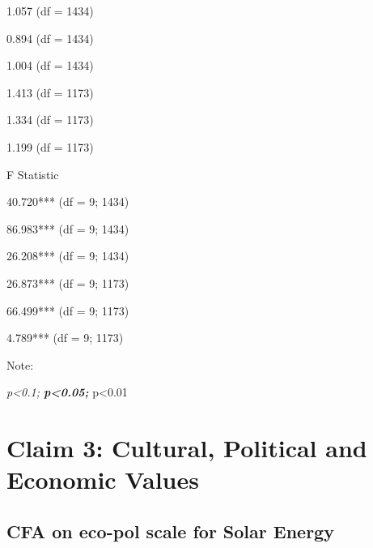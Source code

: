 \documentclass[
]{article}
\begin{document}
\begin{landscape}
1.057 (df = 1434)

0.894 (df = 1434)

1.004 (df = 1434)

1.413 (df = 1173)

1.334 (df = 1173)

1.199 (df = 1173)

F Statistic

40.720*** (df = 9; 1434)

86.983*** (df = 9; 1434)

26.208*** (df = 9; 1434)

26.873*** (df = 9; 1173)

66.499*** (df = 9; 1173)

4.789*** (df = 9; 1173)

Note:

\emph{p\textless0.1; \textbf{p\textless0.05; }}p\textless0.01

\end{landscape}

\newpage

\hypertarget{claim-3-cultural-political-and-economic-values}{%
\section{Claim 3: Cultural, Political and Economic
Values}\label{claim-3-cultural-political-and-economic-values}}

\hypertarget{cfa-on-eco-pol-scale-for-solar-energy}{%
\subsection{CFA on eco-pol scale for Solar
Energy}\label{cfa-on-eco-pol-scale-for-solar-energy}}
\end{document}
